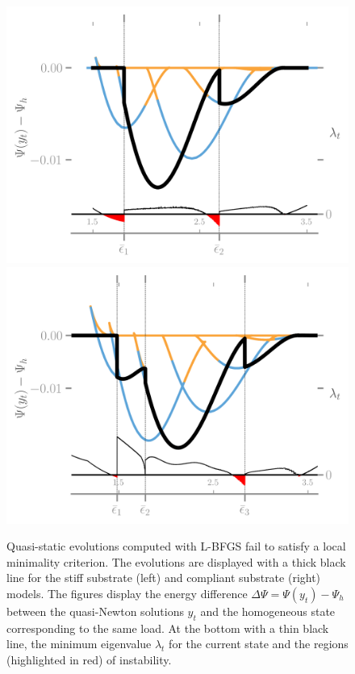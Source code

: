 \begin{figure}[htbp]
    \centering
    \includegraphics*[width=.45\textwidth]{../images/model_stiff_energy_kick.png}
    \includegraphics*[width=.45\textwidth]{../images/model_compliant_energy_kick.png}
    \caption{Quasi-static evolutions computed with L-BFGS fail to satisfy a local minimality criterion. The evolutions are displayed with a thick black line for the stiff substrate (left) and compliant substrate (right) models. The figures display the energy difference $\Delta \Psi = \Psi(y_t)-\Psi_h$ between the quasi-Newton solutions $y_t$ and the homogeneous state corresponding to the same load. At the bottom with a thin black line, the minimum eigenvalue $\lambda_t$ for the current state and the regions (highlighted in red) of instability.}
    \label{fig:}
\end{figure}


